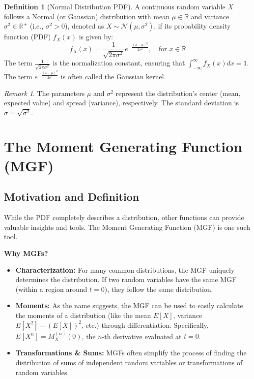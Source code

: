 \documentclass[11pt, letterpaper]{article}
\theoremstyle{definition}
\newtheorem{definition}[theorem]{Definition}
\theoremstyle{remark}
\newtheorem{remark}[theorem]{Remark}
\begin{document}
\begin{definition}[Normal Distribution PDF]
A continuous random variable $X$ follows a Normal (or Gaussian) distribution with mean $\mu \in \mathbb{R}$ and variance $\sigma^2 \in \mathbb{R}^+$ (i.e., $\sigma^2 > 0$), denoted as $X \sim \mathcal{N}(\mu, \sigma^2)$, if its probability density function (PDF) $f_X(x)$ is given by:
\begin{equation}
    f_X(x) = \frac{1}{\sqrt{2 \pi \sigma^2}} e^{-\frac{(x-\mu)^2}{2 \sigma^2}}, \quad \text{for } x \in \mathbb{R}
    \label{eq:normal_pdf}
\end{equation}
The term $\frac{1}{\sqrt{2 \pi \sigma^2}}$ is the normalization constant, ensuring that $\int_{-\infty}^{\infty} f_X(x) dx = 1$. The term $e^{-\frac{(x-\mu)^2}{2 \sigma^2}}$ is often called the Gaussian kernel.
\end{definition}

\begin{remark}
The parameters $\mu$ and $\sigma^2$ represent the distribution's center (mean, expected value) and spread (variance), respectively. The standard deviation is $\sigma = \sqrt{\sigma^2}$.
\end{remark}

\section{The Moment Generating Function (MGF)}

\subsection{Motivation and Definition}

While the PDF completely describes a distribution, other functions can provide valuable insights and tools. The Moment Generating Function (MGF) is one such tool.

\textbf{Why MGFs?}
\begin{itemize}
    \item \textbf{Characterization:} For many common distributions, the MGF uniquely determines the distribution. If two random variables have the same MGF (within a region around $t=0$), they follow the same distribution.
    \item \textbf{Moments:} As the name suggests, the MGF can be used to easily calculate the moments of a distribution (like the mean $E[X]$, variance $E[X^2]-(E[X])^2$, etc.) through differentiation. Specifically, $E[X^n] = M_X^{(n)}(0)$, the $n$-th derivative evaluated at $t=0$.
    \item \textbf{Transformations \& Sums:} MGFs often simplify the process of finding the distribution of sums of independent random variables or transformations of random variables.
\end{itemize}
\end{document}
